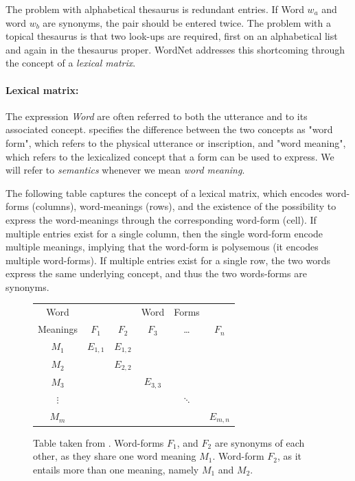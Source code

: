 \documentclass[a4paper,12pt,twoside,openright]{report}
\begin{document}
The problem with alphabetical thesaurus is redundant entries. If Word $w_a$ and word $w_b$ are synonyms, the pair should be entered twice.
The problem with a topical thesaurus is that two look-ups are required, first on an alphabetical list and again in the thesaurus proper.
WordNet addresses this shortcoming through the concept of a \textit{lexical matrix}.

\paragraph{Lexical matrix:} 
The expression \textit{Word} are often referred to both the utterance and to its associated concept.
\cite{miller90} specifies the difference between the two concepts as "word form", which refers to the physical utterance or inscription, and "word meaning", which refers to the lexicalized concept that a form can be used to express.
We will refer to \textit{semantics} whenever we mean \textit{word meaning}.

The following table captures the concept of a lexical matrix, which encodes word-forms (columns), word-meanings (rows), and the existence of the possibility to express the word-meanings through the corresponding word-form (cell).
If multiple entries exist for a single column, then the single word-form encode multiple meanings, implying that the word-form is polysemous (it encodes multiple word-forms).
If multiple entries exist for a single row, the two words express the same underlying concept, and thus the two words-forms are synonyms.


\begin{figure}[H]
\begin{center}
\begin{tabular}{ | c | c  c  c  c  c | } 
 \hline
 Word        &  &  & Word & Forms &  \\ 
 Meanings & $F_1$ & $F_2$ & $F_3$ & \ldots & $F_n$ \\ 
 \hline
 $M_1$     & $E_{1,1}$ & $E_{1,2}$ &  &  &  \\ 
 $M_2$     &  & $E_{2,2}$ &  &  &  \\ 
 $M_3$     &  &  & $E_{3, 3}$ &  &  \\ 
 $\vdots$ &  &  &  & $\ddots$ &  \\ 
 $M_m$    &  &  &  &  & $E_{m, n}$ \\ 
 \hline
\end{tabular}
\end{center}
\caption{Table taken from \cite{miller90}. Word-forms $F_1$, and $F_2$ are synonyms of each other, as they share one word meaning $M_1$. Word-form $F_2$, as it entails more than one meaning, namely $M_1$ and $M_2$.}
\end{figure}
\end{document}
